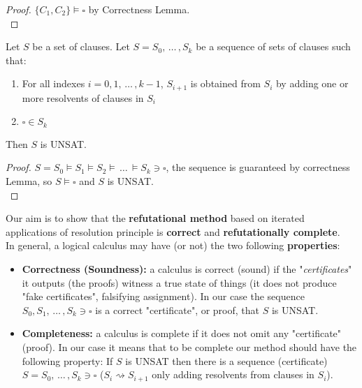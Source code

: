 \begin{proof}
	$\{C_1, C_2\} \models \square$ by Correctness Lemma.\\
\end{proof}

\begin{corollary}
	Let $S$ be a set of clauses. Let $S = S_0, \, \dots \, , S_k$ be a sequence of sets of clauses such that:
	\begin{enumerate}
		\item For all indexes $i = 0, 1, \, \dots \, , k-1$, $S_{i+1}$ is obtained from $S_i$ by adding one or more resolvents of clauses in $S_i$
		\item $\square \in S_k$
	\end{enumerate}
	
	Then $S$ is UNSAT.\\
\end{corollary}

\begin{proof}
	$S = S_0 \models S_1 \models S_2 \models \, \dots \, \models S_k \ni \square$, the sequence is guaranteed by correctness Lemma, so $S \models \square$ and $S$ is UNSAT.\\
\end{proof}

\newpage


Our aim is to show that the \textbf{refutational method} based on iterated applications of resolution principle is \textbf{correct} and \textbf{refutationally complete}.\\

In general, a logical calculus may have (or not) the two following \textbf{properties}:
\begin{itemize}
	\item \textbf{Correctness (Soundness):} a calculus is correct (sound) if the "\textit{certificates}" it outputs (the proofs) witness a true state of things (it does not produce "fake certificates", falsifying assignment). In our case the sequence $S_0, S_1, \, \dots \, , S_k \ni \square$ is a correct "certificate", or proof, that $S$ is UNSAT.\\
	
	\item \textbf{Completeness:} a calculus is complete if it does not omit any "certificate" (proof). In our case it means that to be complete our method should have the following property: If $S$ is UNSAT then there is a sequence (certificate) $S = S_0, \, \dots \, , S_k \ni \square$ ($S_i \rightsquigarrow S_{i+1}$ only adding resolvents from clauses in $S_i$).\\
\end{itemize} 


